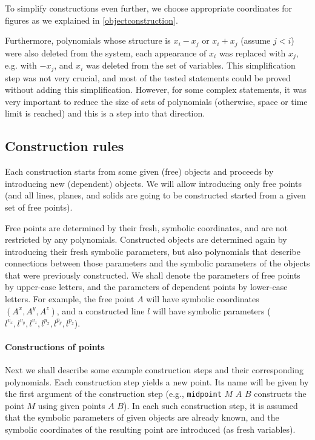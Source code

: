 \documentclass[final,1p,times,authoryear]{elsarticle}
\begin{document}
To simplify constructions even further, we choose appropriate
coordinates for figures as we explained in \ref{objectconstruction}.

Furthermore, polynomials whose structure is $x_i - x_j$ or $x_i + x_j$
(assume $j < i$) were also deleted from the system, each appearance of
$x_i$ was replaced with $x_j$, e.g. with $-x_j$, and $x_i$ was deleted
from the set of variables. This simplification step was not very
crucial, and most of the tested statements could be proved without
adding this simplification. However, for some complex statements, it
was very important to reduce the size of sets of polynomials
(otherwise, space or time limit is reached) and this is a step into
that direction.


\subsection{Construction rules}


Each construction starts from some given (free) objects and proceeds
by introducing new (dependent) objects. We will allow introducing only
free points (and all lines, planes, and solids are going to be
constructed started from a given set of free points).

Free points are determined by their fresh, symbolic coordinates, and
are not restricted by any polynomials. Constructed objects are
determined again by introducing their fresh symbolic parameters, but
also polynomials that describe connections between those parameters
and the symbolic parameters of the objects that were previously
constructed. We shall denote the parameters of free points by
upper-case letters, and the parameters of dependent points by
lower-case letters. For example, the free point $A$ will have symbolic
coordinates $({A}^x, {A}^y, {A}^z)$, and a constructed line $l$ will
have symbolic parameters (${l}^{v_x}, {l}^{v_y}, {l}^{v_z}, {l}^{p_x},
{l}^{p_y}, {l}^{p_z}$).


\paragraph{Constructions of points}

Next we shall describe some example construction steps and their
corresponding polynomials. Each construction step yields a new
point. Its name will be given by the first argument of the
construction step (e.g., {\tt midpoint} $M$ $A$ $B$ constructs the
point $M$ using given points $A$ $B$). In each such construction step,
it is assumed that the symbolic parameters of given objects are
already known, and the symbolic coordinates of the resulting point are
introduced (as fresh variables).
\end{document}
